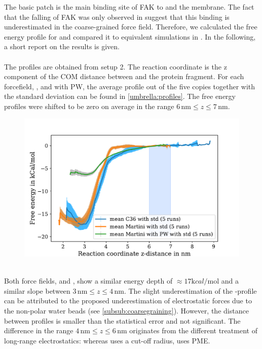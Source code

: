 \label{results:umbrella}
The basic patch is the main binding site of FAK to \pip{} and the membrane. The fact that the falling of FAK was only observed in \martini{} suggest that this binding is underestimated in the coarse-grained force field. Therefore, we calculated the free energy profile for \martini{} and compared it to equivalent simulations in \charmm{}. In the following, a short report on the results is given.\\
\\
The profiles are obtained from setup 2. The reaction coordinate is the z component of the COM distance between \pip{} and the protein fragment. For each forcefield, \charmm{}, \martini{} and \martini{} with PW, the average profile out of the five copies together with the standard deviation can be found in \autoref{umbrella:profiles}. The free energy profiles were shifted to be zero on average in the range $6\,\si{\nano\metre} \le z \le 7\,\si{\nano\metre}$.\\
%
%
%
\begin{figure}[hb]
	\centering
	\includegraphics[width=.8\textwidth]{figures/results/umbrella}
	\label{umbrella:profiles}
\end{figure}
%
%
%
\\
Both force fields, \charmm{} and \martini{}, show a similar energy depth of $\approx 17 \si{\kilo cal/\mole}$ and a similar slope between $3\,\si{\nano\metre} \le z \le 4\,\si{\nano\metre}$. The slight underestimation of the \martini{}-profile can be attributed to the proposed underestimation of electrostatic forces due to the non-polar water beads (see \autoref{subsub:coarsegraining}). However, the distance between profiles is smaller than the statistical error and not significant. The difference in the range $4\,\si{\nano\metre} \le z \le 6\,\si{\nano\metre}$ originates from the different treatment of long-range electrostatics: whereas \martini{} uses a cut-off radius, \charmm{} uses PME.\\
